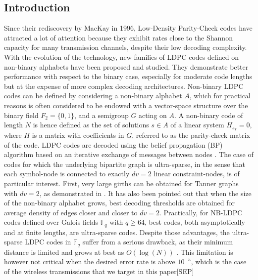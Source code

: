 {\begin{enumerate}
\section{Introduction}
Since their rediscovery by MacKay \cite{MacKay} in 1996, Low-Density Parity-Check codes have attracted a lot of attention because they exhibit rates close to the Shannon capacity \cite{Shannon} for many transmission channels, despite their low decoding complexity. With the evolution of the technology, new families of LDPC codes defined on non-binary alphabets have been proposed and studied. They demonstrate better performance with respect to the binary case, especially for moderate code lengths \cite{LDPC} but at the expense of more complex decoding architectures.
Non-binary LDPC codes can be defined by considering a non-binary alphabet $A$, which for practical reasons is often considered to be endowed with a vector-space structure over the binary field $F_2=\{0,1\}$, and a semigroup $G$ acting on $A$. A non-binary code of length $N$ is hence defined as the set of solutions $s\in A$ of a linear system $H_{s_T}=0$, where $H$ is a matrix with coefficients in $G$, referred to as the parity-check matrix of the code.
LDPC codes are decoded using the belief propagation (BP) algorithm based on an iterative exchange of messages between nodes \cite{BP,BP2}.
The case of codes for which the underlying bipartite graph is ultra-sparse, in the sense that each symbol-node is connected to exactly $dv=2$ linear constraint-nodes, is of particular interest. First, very large girths can be obtained for Tanner graphs with $dv=2$, as demonstrated in \cite{LDPC2,LDPC3}. It has also been pointed out \cite{LDPC4,LDPC5} that when the size of the non-binary alphabet grows, best decoding thresholds are obtained for average density of edges closer and closer to $dv=2$.
Practically, for NB-LDPC codes defined over Galois fields $\mathbb{F}_q$ with $q\geq64$, best codes, both asymptotically and at finite lengths, are ultra-sparse codes. Despite those advantages, the ultra-sparse LDPC codes in $\mathbb{F}_q$ suffer from a serious drawback, as their minimum distance is limited and grows at best as $O(\log(N))$ \cite{LDPC5}. This limitation is however not critical when the desired error rate is above $10^{-5}$, which is the case of the wireless transmissions that we target in this paper[SEP]
\importpackages{}
\graphicspath{ {./images/} }



\end{enumerate}}
